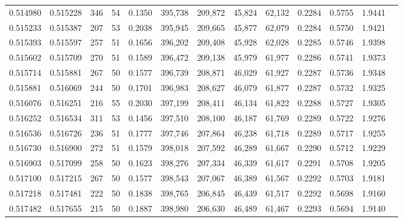 \begin{tabular}{rrrrrrrrrrrrr}
0.514980 & 0.515228 &   346 &  54 &                                     0.1350 & 395,738 & 209,872 &  45,824 &  62,132 & 0.2284 & 0.5755 & 1.9441 \\
0.515233 & 0.515387 &   207 &  53 &                                     0.2038 & 395,945 & 209,665 &  45,877 &  62,079 & 0.2284 & 0.5750 & 1.9421 \\
0.515393 & 0.515597 &   257 &  51 &                                     0.1656 & 396,202 & 209,408 &  45,928 &  62,028 & 0.2285 & 0.5746 & 1.9398 \\
0.515602 & 0.515709 &   270 &  51 &                                     0.1589 & 396,472 & 209,138 &  45,979 &  61,977 & 0.2286 & 0.5741 & 1.9373 \\
0.515714 & 0.515881 &   267 &  50 &                                     0.1577 & 396,739 & 208,871 &  46,029 &  61,927 & 0.2287 & 0.5736 & 1.9348 \\
0.515881 & 0.516069 &   244 &  50 &                                     0.1701 & 396,983 & 208,627 &  46,079 &  61,877 & 0.2287 & 0.5732 & 1.9325 \\
0.516076 & 0.516251 &   216 &  55 &                                     0.2030 & 397,199 & 208,411 &  46,134 &  61,822 & 0.2288 & 0.5727 & 1.9305 \\
0.516252 & 0.516534 &   311 &  53 &                                     0.1456 & 397,510 & 208,100 &  46,187 &  61,769 & 0.2289 & 0.5722 & 1.9276 \\
0.516536 & 0.516726 &   236 &  51 &                                     0.1777 & 397,746 & 207,864 &  46,238 &  61,718 & 0.2289 & 0.5717 & 1.9255 \\
0.516730 & 0.516900 &   272 &  51 &                                     0.1579 & 398,018 & 207,592 &  46,289 &  61,667 & 0.2290 & 0.5712 & 1.9229 \\
0.516903 & 0.517099 &   258 &  50 &                                     0.1623 & 398,276 & 207,334 &  46,339 &  61,617 & 0.2291 & 0.5708 & 1.9205 \\
0.517100 & 0.517215 &   267 &  50 &                                     0.1577 & 398,543 & 207,067 &  46,389 &  61,567 & 0.2292 & 0.5703 & 1.9181 \\
0.517218 & 0.517481 &   222 &  50 &                                     0.1838 & 398,765 & 206,845 &  46,439 &  61,517 & 0.2292 & 0.5698 & 1.9160 \\
0.517482 & 0.517655 &   215 &  50 &                                     0.1887 & 398,980 & 206,630 &  46,489 &  61,467 & 0.2293 & 0.5694 & 1.9140 \\

\end{tabular}
